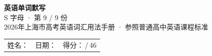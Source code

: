 \documentclass[10pt,a4paper]{article}
\begin{document}
\pagestyle{plain}

\begin{center}
{\LARGE\bfseries 英语单词默写}\\[0.22em]
{\large S 字母 · 第 9 / 9 份}\\[0.18em]
{\small 2026年上海市高考英语词汇用法手册 · 参照普通高中英语课程标准}
\end{center}

\vspace{0.25em}
\noindent\begin{tabular}{@{}p{}@{}p{}@{}p{}@{}}
姓名：\underline{\hspace{2.0cm}} & 日期：\underline{\hspace{2.0cm}} & 得分：\underline{\hspace{1.3cm}}\,/\,46 \\
\end{tabular}

\vspace{0.3em}

\vspace{0.08em}
\end{document}

